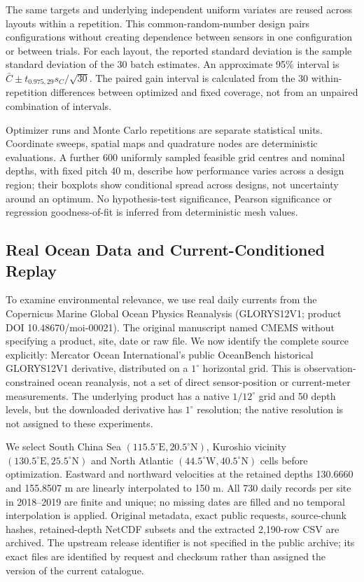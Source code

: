 \documentclass[fleqn,10pt]{wlscirep}
\begin{document}
The same targets and underlying independent uniform variates are reused across layouts within a repetition. This common-random-number design pairs configurations without creating dependence between sensors in one configuration or between trials. For each layout, the reported standard deviation is the sample standard deviation of the 30 batch estimates. An approximate 95\% interval is $\bar C\pm t_{0.975,29}s_C/\sqrt{30}$. The paired gain interval is calculated from the 30 within-repetition differences between optimized and fixed coverage, not from an unpaired combination of intervals.

Optimizer runs and Monte Carlo repetitions are separate statistical units. Coordinate sweeps, spatial maps and quadrature nodes are deterministic evaluations. A further 600 uniformly sampled feasible grid centres and nominal depths, with fixed pitch 40 m, describe how performance varies across a design region; their boxplots show conditional spread across designs, not uncertainty around an optimum. No hypothesis-test significance, Pearson significance or regression goodness-of-fit is inferred from deterministic mesh values.


\subsection*{Real Ocean Data and Current-Conditioned Replay}
To examine environmental relevance, we use real daily currents from the Copernicus Marine Global Ocean Physics Reanalysis (GLORYS12V1; product DOI 10.48670/moi-00021)\cite{cmems_glorys,lellouche2021}. The original manuscript named CMEMS without specifying a product, site, date or raw file. We now identify the complete source explicitly: Mercator Ocean International's public OceanBench historical GLORYS12V1 derivative, distributed on a $1^\circ$ horizontal grid\cite{oceanbench_archive}. This is observation-constrained ocean reanalysis, not a set of direct sensor-position or current-meter measurements. The underlying product has a native $1/12^\circ$ grid and 50 depth levels, but the downloaded derivative has $1^\circ$ resolution; the native resolution is not assigned to these experiments.

We select South China Sea $(115.5^\circ\mathrm E,20.5^\circ\mathrm N)$, Kuroshio vicinity $(130.5^\circ\mathrm E,25.5^\circ\mathrm N)$ and North Atlantic $(44.5^\circ\mathrm W,40.5^\circ\mathrm N)$ cells before optimization. Eastward and northward velocities at the retained depths 130.6660 and 155.8507 m are linearly interpolated to 150 m. All 730 daily records per site in 2018--2019 are finite and unique; no missing dates are filled and no temporal interpolation is applied. Original metadata, exact public requests, source-chunk hashes, retained-depth NetCDF subsets and the extracted 2,190-row CSV are archived. The upstream release identifier is not specified in the public archive; its exact files are identified by request and checksum rather than assigned the version of the current catalogue.
\end{document}
